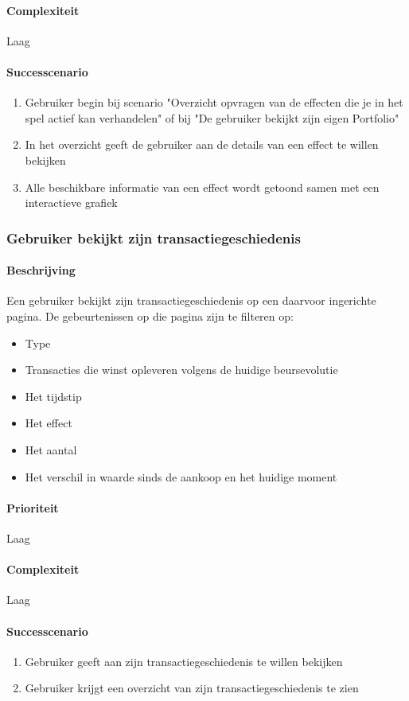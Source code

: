 \paragraph{Complexiteit}Laag
\paragraph{Successcenario}
\begin{enumerate}
 \item Gebruiker begin bij scenario "Overzicht opvragen van de effecten die je in het spel actief kan verhandelen" of bij "De gebruiker bekijkt zijn eigen Portfolio"
 \item In het overzicht geeft de gebruiker aan de details van een effect te willen bekijken
 \item Alle beschikbare informatie van een effect wordt getoond samen met een interactieve grafiek
\end{enumerate}

\subsubsection{Gebruiker bekijkt zijn transactiegeschiedenis}
\paragraph{Beschrijving} Een gebruiker bekijkt zijn transactiegeschiedenis op een daarvoor ingerichte pagina. De gebeurtenissen op die pagina zijn te filteren op:
\begin{itemize}
	\item Type
	\item Transacties die winst opleveren volgens de huidige beursevolutie
	\item Het tijdstip
	\item Het effect
	\item Het aantal
	\item Het verschil in waarde sinds de aankoop en het huidige moment
\end{itemize}
\paragraph{Prioriteit}Laag
\paragraph{Complexiteit}Laag
\paragraph{Successcenario}
\begin{enumerate}
 \item Gebruiker geeft aan zijn transactiegeschiedenis te willen bekijken
 \item Gebruiker krijgt een overzicht van zijn transactiegeschiedenis te zien
\end{enumerate}


